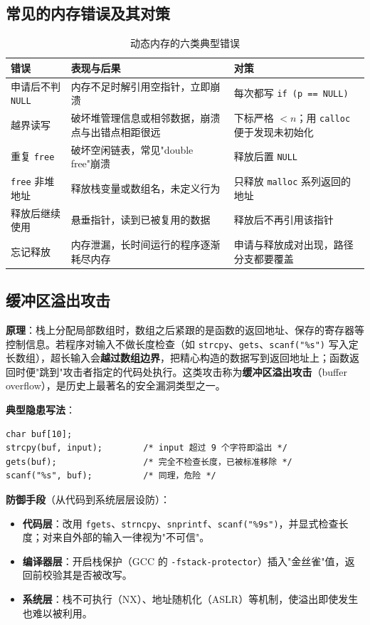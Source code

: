 \subsection{常见的内存错误及其对策}
\begin{table}[htbp]
\centering
\caption{动态内存的六类典型错误}
\footnotesize
\begin{tabularx}{\textwidth}{@{}p{4.4cm}Xp{3.6cm}@{}}
\toprule
错误 & 表现与后果 & 对策 \\
\midrule
申请后不判 \texttt{NULL} & 内存不足时解引用空指针，立即崩溃 & 每次都写 \texttt{if (p == NULL)} \\
越界读写 & 破坏堆管理信息或相邻数据，崩溃点与出错点相距很远 & 下标严格 $<n$；用 \texttt{calloc} 便于发现未初始化 \\
重复 \texttt{free} & 破坏空闲链表，常见"double free"崩溃 & 释放后置 \texttt{NULL} \\
\texttt{free} 非堆地址 & 释放栈变量或数组名，未定义行为 & 只释放 \texttt{malloc} 系列返回的地址 \\
释放后继续使用 & 悬垂指针，读到已被复用的数据 & 释放后不再引用该指针 \\
忘记释放 & 内存泄漏，长时间运行的程序逐渐耗尽内存 & 申请与释放成对出现，路径分支都要覆盖 \\
\bottomrule
\end{tabularx}
\end{table}

\subsection{缓冲区溢出攻击}
\textbf{原理}：栈上分配局部数组时，数组之后紧跟的是函数的返回地址、保存的寄存器等控制信息。若程序对输入不做长度检查（如 \texttt{strcpy}、\texttt{gets}、\texttt{scanf("\%s")} 写入定长数组），超长输入会\textbf{越过数组边界}，把精心构造的数据写到返回地址上；函数返回时便"跳到"攻击者指定的代码处执行。这类攻击称为\textbf{缓冲区溢出攻击}（buffer overflow），是历史上最著名的安全漏洞类型之一。

\textbf{典型隐患写法}：
\begin{lstlisting}
char buf[10];
strcpy(buf, input);        /* input 超过 9 个字符即溢出 */
gets(buf);                 /* 完全不检查长度，已被标准移除 */
scanf("%s", buf);          /* 同理，危险 */
\end{lstlisting}

\textbf{防御手段}（从代码到系统层层设防）：
\begin{itemize}
  \item \textbf{代码层}：改用 \texttt{fgets}、\texttt{strncpy}、\texttt{snprintf}、\texttt{scanf("\%9s")}，并显式检查长度；对来自外部的输入一律视为"不可信"。
  \item \textbf{编译器层}：开启栈保护（GCC 的 \texttt{-fstack-protector}）插入"金丝雀"值，返回前校验其是否被改写。
  \item \textbf{系统层}：栈不可执行（NX）、地址随机化（ASLR）等机制，使溢出即使发生也难以被利用。
\end{itemize}

